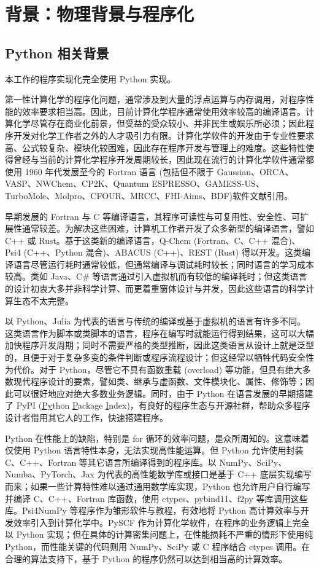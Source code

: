 \section{背景：物理背景与程序化}
\label{sec.3.3.background}

\subsection{Python 相关背景}

本工作的程序实现化完全使用 Python 实现。

第一性计算化学的程序化问题，通常涉及到大量的浮点运算与内存调用，对程序性能的效率要求相当高。因此，目前计算化学程序通常使用效率较高的编译语言。计算化学尽管存在商业化前景，但受益的受众较小、并非民生或娱乐所必须；因此程序开发对化学工作者之外的人才吸引力有限。计算化学软件的开发由于专业性要求高、公式较复杂、模块化较困难，因此存在程序开发与管理上的难度。这些特性使得曾经与当前的计算化学程序开发周期较长，因此现在流行的计算化学软件通常都使用 1960 年代发展至今的 Fortran 语言 (包括但不限于 Gaussian、ORCA、VASP、NWChem、CP2K、Quantum ESPRESSO、GAMESS-US、TurboMole、Molpro、CFOUR、MRCC、FHI-Aims、BDF)\alert{软件文献引用}。

早期发展的 Fortran 与 C 等编译语言，其程序可读性与可复用性、安全性、可扩展性通常较差。为解决这些困难，计算机工作者开发了众多新型的编译语言，譬如 C++ 或 Rust。基于这类新的编译语言，Q-Chem (Fortran、C、C++ 混合)、Psi4 (C++、Python 混合)、ABACUS (C++)、REST (Rust) 得以开发。这类编译语言尽管运行耗时通常较低，但通常编译与调试耗时较长；同时语言的学习成本较高。类如 Java、C\# 等语言通过引入虚拟机而有较低的编译耗时；但这类语言的设计初衷大多并非科学计算、而更着重窗体设计与并发，因此这些语言的科学计算生态不太完整。

以 Python、Julia 为代表的语言与传统的编译或基于虚拟机的语言有许多不同。这类语言作为脚本或类脚本的语言，程序在编写时就能运行得到结果，这可以大幅加快程序开发周期；同时不需要严格的类型推断，因此这类语言从设计上就是泛型的，且便于对于复杂多变的条件判断或程序流程设计；但这经常以牺牲代码安全性为代价。对于 Python，尽管它不具有函数重载 (overload) 等功能，但具有绝大多数现代程序设计的要素，譬如类、继承与虚函数、文件模块化、属性、修饰等；因此可以很好地应对绝大多数业务逻辑。同时，由于 Python 在语言发展的早期搭建了 PyPI (\underline{Py}thon \underline{P}ackage \underline{I}ndex)，有良好的程序生态与开源社群，帮助众多程序设计者借用其它人的工作，快速搭建程序。

Python 在性能上的缺陷，特别是 for 循环的效率问题，是众所周知的。这意味着仅使用 Python 语言特性本身，无法实现高性能运算。但 Python 允许使用封装 C、C++、Fortran 等其它语言所编译得到的程序库。以 NumPy、SciPy、Numba、PyTorch、Jax 为代表的高性能数学库或接口是基于 C++ 底层实现编写而来；如果一些计算特性难以通过通用数学库实现，Python 也允许用户自行编写并编译 C、C++、Fortran 库函数，使用 ctypes、pybind11、f2py 等库调用这些库。Psi4NumPy 等程序作为雏形软件与教程，有效地将 Python 高计算效率与开发效率引入到计算化学中。PySCF 作为计算化学软件，在程序的业务逻辑上完全以 Python 实现；但在具体的计算密集问题上，在性能损耗不严重的情形下使用纯 Python，而性能关键的代码则用 NumPy、SciPy 或 C 程序结合 ctypes 调用。在合理的算法支持下，基于 Python 的程序仍然可以达到相当高的计算效率。

